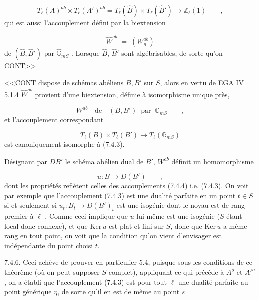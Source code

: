 \begin{equation}\tag{7.4.3}
T_{\ell}(A)^{ab} \times T_{\ell}(A')^{ab} = T_{\ell}(\hat{B}) \times T_{\ell}(\hat{B}') \longrightarrow \mathbb{Z}_{\ell}(1) \qquad ,
\end{equation}
qui est aussi l'accouplement défini par la biextension

\begin{equation*}
\hat{W}^{ab} \;=\; (W_{n}^{ab})
\end{equation*}
de $(\hat{B},\hat{B}')$ par $\hat{\mathbb{G}}_{mS}$ . Lorsque $\hat{B}$, $\hat{B}'$ sont algébrisables, de sorte qu'on CONT>>



<<CONT dispose de schémas abéliens $B,B'$ sur $S$, alors en vertu de EGA IV 5.1.4 $\hat{W}^{ab}$ provient d'une biextension, définie à isomorphisme unique près,

\begin{equation*}
W^{ab} \quad \text{de} \quad (B,B') \;\; \text{par} \;\; \mathbb{G}_{mS} \qquad ,
\end{equation*}
et l'accouplement correspondant

\begin{equation}\tag{7.4.4}
T_{\ell}(B) \times T_{\ell}(B') \longrightarrow T_{\ell}(\mathbb{G}_{mS})
\end{equation}
est canoniquement isomorphe à (7.4.3).

Désignant par $DB'$ le schéma abélien dual de $B'$, $W^{ab}$ définit un homomorphisme

\begin{equation}\tag{7.4.5}
u : B \longrightarrow D(B') \qquad ,
\end{equation}
dont les propriétés reflètent celles des accouplements (7.4.4) i.e. (7.4.3). On voit par exemple que l'accouplement (7.4.3) est une dualité parfaite en un point $t \in S$ si et seulement si $u_{t} : B_{t} \longrightarrow D(B')_{t}$ est une isogénie dont le noyau est de rang premier à $\ell$ . Comme ceci implique que $u$ lui-même est une isogénie ($S$ étant local donc connexe), et que $\mathrm{Ker}\,u$ est plat et fini sur $S$, donc que $\mathrm{Ker}\,u$ a même rang en tout point, on voit que la condition qu'on vient d'envisager est indépendante du point choisi $t$.

7.4.6. Ceci achève de prouver en particulier 5.4, puisque sous les conditions de ce théorème (où on peut supposer $S$ complet), appliquant ce qui précède à $A^{o}$ et ${A'}^{o}$, on a établi que l'accouplement (7.4.3) est pour tout $\ell$ une dualité parfaite au point générique $\eta$, de sorte qu'il en est de même au point $s$.


